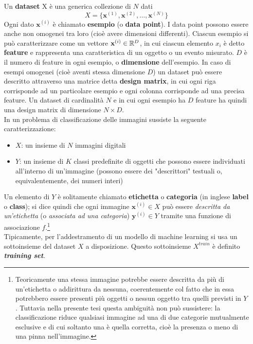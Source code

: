 Un \textbf{dataset} X è una generica collezione di $N$ dati
\[X=\{\mathbf{x}^{(1)},\mathbf{x}^{(2)},\dots,\mathbf{x}^{(N)}\}\]
Ogni dato $\mathbf{x}^{(i)}$ è chiamato \textbf{esempio} (o \textbf{data point}).
I data point possono essere anche non omogenei tra loro (cioè avere dimensioni differenti).
Ciascun esempio si può caratterizzare come un vettore $\mathbf{x}^{(i)}\in\mathbb{R}^{D}$, in cui ciascun elemento $x_i$ è detto \textbf{feature} e rappresenta una caratteristica di un oggetto o un evento misurato. $D$ è il numero di feature in ogni esempio, o \textbf{dimensione} dell'esempio.
In caso di esempi omogenei (cioè aventi stessa dimensione $D$) un dataset può essere descritto attraverso una matrice detta \textbf{design matrix}, in cui ogni riga corrisponde ad un particolare esempio e ogni colonna corrisponde ad una precisa feature.
Un dataset di cardinalità $N$ e in cui ogni esempio ha $D$ feature ha quindi una design matrix di dimensione $N\times D$. \\

In un problema di classificazione delle immagini sussiste la seguente caratterizzazione:
\begin{itemize}
\item $X$: un insieme di $N$ immagini digitali
\item $Y$: un insieme di $K$ classi predefinite di oggetti che possono essere individuati all'interno di un'immagine (possono essere dei "descrittori" testuali o, equivalentemente, dei numeri interi)
\end{itemize}
Un elemento di $Y$ è solitamente chiamato \textbf{etichetta} o \textbf{categoria} (in inglese \textbf{label} o \textbf{class}); si dice quindi che ogni immagine $\mathbf{x}^{(i)}\in X$ può essere \textit{descritta da un'etichetta} (o \textit{associata ad una categoria}) $\mathbf{y}^{(i)}\in Y$ tramite una funzione di associazione $f$.\footnote{Teoricamente una stessa immagine potrebbe essere descritta da più di un'etichetta o addirittura da nessuna, coerentemente col fatto che in essa potrebbero essere presenti più oggetti o nessun oggetto tra quelli previsti in $Y$. Tuttavia nella presente tesi questa ambiguità non può sussistere: la classificazione riduce qualsiasi immagine ad una di due categorie mutualmente esclusive e di cui soltanto una è quella corretta, cioè la presenza o meno di una pinna nell'immagine.}\\

Tipicamente, per l'addestramento di un modello di machine learning si usa un sottoinsieme del dataset $X$ a disposizione. Questo sottoinsieme $X^{train}$ è definito \textbf{\textit{training set}}.

